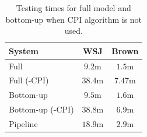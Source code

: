 
\begin{table}[ht]

    \centering
    \begin{tabular}{|p{3.0cm}|c|c|}\hline
        System                           & WSJ       & Brown   \\\hline 
        Full                             & $9.2$m    & $1.5$m  \\
        Full (-CPI)                      & $38.4$m   & $7.47$m  \\
        Bottom-up                        & $9.5$m    & $1.6$m  \\
        Bottom-up (-CPI)                 & $38.8$m   & $6.9$m  \\
        Pipeline                         & $18.9$m   & $2.9$m  \\\hline
    \end{tabular}
    \caption{Testing times for full model and bottom-up when CPI algorithm is
    not used.}
    \label{tbl:nocpi}
\end{table}


